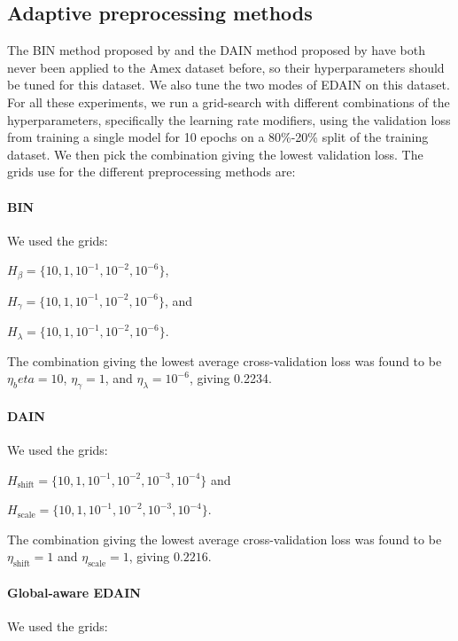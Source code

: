 \documentclass{statsmsc}
\begin{document}
{\subsection{Adaptive preprocessing methods}

The \ac{BIN} method proposed by \cite{bin} and the \ac{DAIN} method proposed by \cite{dain} have
both never been applied to the Amex dataset before, so their hyperparameters should be tuned
for this dataset. We also tune the two modes of \ac{EDAIN} on this dataset. For all these
experiments, we run a grid-search with different combinations of the hyperparameters, specifically
the learning rate modifiers, using the validation loss from training a single model for 10
epochs on a 80\%-20\% split of the training dataset. We then pick the combination giving
the lowest validation loss. The grids use for the different preprocessing methods are:

\paragraph{BIN}%

We used the grids:

$H_{\beta}=\{10,1,10^{-1},10^{-2},10^{-6}\}$,

$H_{\gamma}=\{10,1,10^{-1},10^{-2},10^{-6}\}$, and

$H_{\lambda}=\{10,1,10^{-1},10^{-2},10^{-6}\}$.

The combination giving the lowest average cross-validation loss was found to be
$\eta_beta=10$, $\eta_\gamma=1$, and $\eta_\lambda=10^{-6}$, giving 0.2234.

\paragraph{DAIN}%

We used the grids:

$H_{\textrm{shift}}=\{10,1,10^{-1},10^{-2},10^{-3},10^{-4}\}$ and

$H_{\textrm{scale}}=\{10,1,10^{-1},10^{-2},10^{-3},10^{-4}\}$.

The combination giving the lowest average cross-validation loss was found to be
$\eta_{\textrm{shift}}=1$ and $\eta_{\textrm{scale}}=1$, giving $0.2216$.

\paragraph{Global-aware EDAIN}%

We used the grids:

}
\end{document}
